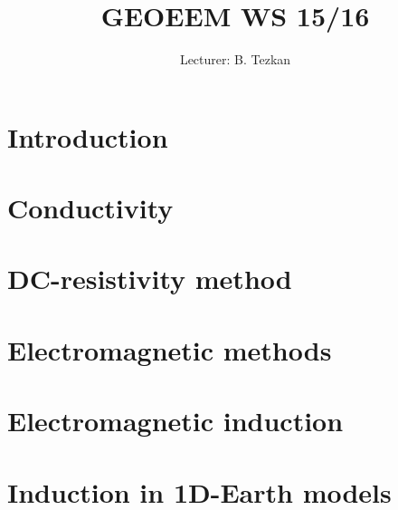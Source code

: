 \documentclass[11pt,a4paper]{article}
\title{GEOEEM WS 15/16}
\author{Lecturer: B. Tezkan}
\numberwithin{equation}{section}
\numberwithin{figure}{section}
\begin{document}
\newcommand{\tens}[1]{\underline{\underline{#1}}}

\graphicspath{ {figs/} }

\begin{titlepage}
\maketitle
\thispagestyle{empty}
\end{titlepage}
\newpage
\tableofcontents
\newpage

\setcounter{section}{-1}
\section{Introduction}


\section{Conductivity}

\section{DC-resistivity method}

\section*{Electromagnetic methods}
\section{Electromagnetic induction}

\section{Induction in 1D-Earth models}

\end{document}
